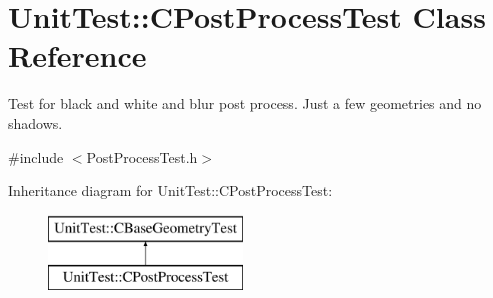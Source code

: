 \hypertarget{class_unit_test_1_1_c_post_process_test}{}\section{Unit\+Test\+::C\+Post\+Process\+Test Class Reference}
\label{class_unit_test_1_1_c_post_process_test}


Test for black and white and blur post process. Just a few geometries and no shadows.  




{\ttfamily \#include $<$Post\+Process\+Test.\+h$>$}

Inheritance diagram for Unit\+Test\+::C\+Post\+Process\+Test\+:\begin{figure}[H]
\begin{center}
\leavevmode
\includegraphics[height=2.000000cm]{class_unit_test_1_1_c_post_process_test}
\end{center}
\end{figure}
